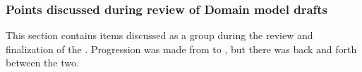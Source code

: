 \documentclass{article}
\begin{document}





\subsubsection{Points discussed during review of Domain model drafts}

This section contains items discussed as a group during the review and finalization of the . Progression was made from  to , but there was back and forth between the two.
\end{document}
